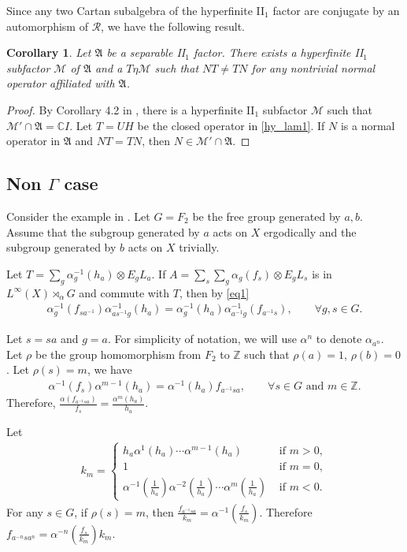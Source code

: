 \documentclass[a4paper,10pt]{amsart}
\newtheorem{corollary}{Corollary}[section]
\newcommand{\AAA}{\mathfrak A}
\newcommand{\MMM}{\mathcal M}
\newcommand{\C}{\mathbb C} %
\newcommand{\Z}{\mathbb Z} %
\begin{document}
Since any two Cartan subalgebra of the hyperfinite II$_1$ factor are conjugate by
an automorphism of $\mathcal{R}$, we have the following result.

\begin{corollary} \label{hy_cor1}
   Let $\AAA$ be a separable II$_1$ factor. There exists a hyperfinite II$_1$ 
   subfactor $\MMM$ of $\AAA$ and a 
   $T \eta \MMM$ such that 
   $NT \neq TN$ for any nontrivial normal operator affiliated with $\AAA$.
\end{corollary}

\begin{proof}
    By Corollary 4.2 in \cite{P}, there is a hyperfinite II$_1$ subfactor $\MMM$ 
    such that $\MMM' \cap \AAA = \C I$. 
    Let $T = UH$ be the closed operator in \cref{hy_lam1}.
    If $N$ is a normal operator in $\AAA$ and $NT = TN$, then $N \in \MMM' \cap \AAA$. 
\end{proof}

\subsection{Non $\Gamma$ case}
Consider the example in \cite{WY}. Let $G = F_{2}$ be the free group 
generated by $a, b$. Assume that the subgroup generated by $a$ acts on 
$X$ ergodically and the subgroup generated by $b$ acts on $X$ trivially.

Let $T = \sum_{g} \alpha_{g}^{-1}(h_{a}) \otimes E_{g}L_{a}$.
If $A = \sum_{s} \sum_{g} \alpha_{g}(f_{s}) 
\otimes E_{g}L_{s}$
is in $L^{\infty}(X) \rtimes_{\alpha} G$ and 
commute with $T$, then by \cref{eq1} 
\begin{align*}
    \alpha_{g}^{-1}(f_{sa^{-1}})\alpha_{as^{-1}g}^{-1}(h_{a}) =
    \alpha_{g}^{-1}(h_{a})\alpha_{a^{-1}g}^{-1}(f_{a^{-1}s}), \qquad \forall g, s \in G.
\end{align*}

Let $s = sa$ and $g = a$. For simplicity
of notation, we will use $\alpha^{n}$ to denote
$\alpha_{a^{n}}$. Let $\rho$ be the group homomorphism from $F_2$ to $\Z$ 
such that $\rho(a) = 1$,
$\rho(b) = 0$. Let $\rho(s) = m$, we have
\begin{align*}
    \alpha^{-1}(f_{s})\alpha^{m-1}(h_{a}) =
    \alpha^{-1}(h_{a})f_{a^{-1}sa}, \qquad \forall s \in G \mbox{ and } m \in \Z.
\end{align*}
Therefore, $\frac{\alpha(f_{a^{-1}sa})}{f_s} = \frac{\alpha^{m}(h_a)}{h_a}$. 

Let
\begin{align*}
   k_{m} =  \begin{cases}
       h_{a}\alpha^{1}(h_{a})\cdots\alpha^{m-1}(h_{a}) &\mbox{ if } m > 0, \\
       1 &\mbox{ if } m = 0, \\
       \alpha^{-1}(\frac{1}{h_a})\alpha^{-2}(\frac{1}{h_a})
       \cdots\alpha^{m}(\frac{1}{h_a}) &\mbox{ if } m < 0.
   \end{cases} 
\end{align*}
For any $s \in G$, if $\rho(s)=m$, then 
$\frac{f_{a^{-1}sa}}{k_m} = \alpha^{-1}(\frac{f_s}{k_m})$.
Therefore $f_{a^{-n}sa^{n}} = \alpha^{-n}(\frac{f_s}{k_m})k_m$.
\end{document}
